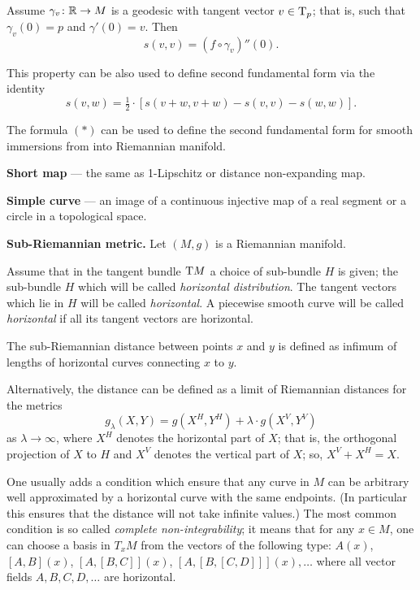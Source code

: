 \begin{description}
Assume $\gamma_v\colon\mathbb{R}\to M$ is a geodesic with tangent vector $v\in \mathrm{T}_p$;
that is, such that $\gamma_v(0)=p$ and $\gamma'(0)=v$.
Then 
\[s(v,v)=(f\circ\gamma_v)''(0).\]

This property can be also used to define second fundamental form via the identity
$$s(v,w)=\tfrac 12\cdot[s(v+w,v+w)-s(v,v)-s(w,w)].$$

The formula $({*})$ can be used to define the second fundamental form for smooth immersions from into Riemannian manifold.

\item{\bf Short map}\label{Short map} --- the same as 1-Lipschitz 
or distance non-expanding map.

\item{\bf Simple curve}\label{Simple curve} --- an image of a continuous injective map of a real segment or a circle in a topological space.

\item{\bf Sub-Riemannian metric.}\label{Sub-Riemannian metric}
Let $(M,g)$ is a Riemannian manifold.

Assume that in the tangent bundle $\mathrm{T} M$ 
a choice of sub-bundle $H$ is given;
the sub-bundle $H$ which will be called  \emph{horizontal distribution}.
The tangent vectors which lie in $H$ will be called \emph{horizontal}.
A piecewise smooth curve will be called \emph{horizontal}
if all its tangent vectors are horizontal.

The sub-Riemannian distance between points $x$ and $y$ is defined as infimum of lengths of horizontal curves connecting $x$ to $y$.

Alternatively, the distance can be defined as a limit of Riemannian distances 
for the metrics 
\[g_\lambda(X,Y)=g(X^H,Y^H)+\lambda\cdot g(X^V,Y^V)\] 
as $\lambda\to \infty$,
where $X^H$ denotes the horizontal part of $X$;
that is, the orthogonal projection of $X$ to $H$
and $X^V$ denotes the vertical part of $X$;
so, $X^V+X^H=X$.

One usually adds a condition which ensure that any curve in $M$ can be arbitrary well approximated by a horizontal curve with the same endpoints.
(In particular this ensures that the distance will not take infinite values.)
The most common condition is so called  \emph{complete non-integrability};
it means that for any $x\in M$, 
one can choose a basis in $T_xM$
from the vectors of the following type:
$A(x)$, $[A,B](x)$, $[A,[B,C]](x)$, $[A,[B,[C,D]]](x),\dots$ where all vector fields $A,B,C,D, \dots$ are horizontal.



\end{description}

